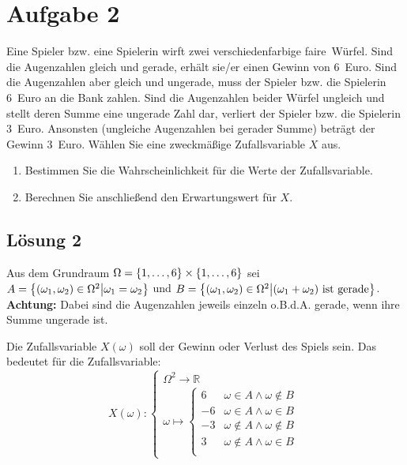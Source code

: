 \documentclass[main.tex]{subfiles}
\begin{document}
\section{Aufgabe 2}
Eine Spieler bzw. eine Spielerin wirft zwei verschiedenfarbige \glqq faire\grqq~Würfel. Sind die Augenzahlen gleich und gerade, erhält sie/er einen Gewinn von 6~Euro. Sind die Augenzahlen aber gleich und ungerade, muss der Spieler bzw. die Spielerin 6~Euro an die Bank zahlen. Sind die Augenzahlen beider Würfel ungleich und stellt deren Summe eine ungerade Zahl dar, verliert der Spieler bzw. die Spielerin 3~Euro. Ansonsten (ungleiche Augenzahlen bei gerader Summe) beträgt der Gewinn 3~Euro. Wählen Sie eine zweckmäßige Zufallsvariable $X$ aus.
\begin{enumerate}
    \item Bestimmen Sie die Wahrscheinlichkeit für die Werte der Zufallsvariable.
    \item Berechnen Sie anschließend den Erwartungswert für $X$.
\end{enumerate}

\subsection{Lösung 2}
Aus dem Grundraum $\Omega = \set*{1,\ldots, 6} \times \set*{1,\ldots, 6}$ sei $A=\set*{(\omega_1, \omega_2)\in \Omega^2 \middle| \omega_1 = \omega_2}$ und $B=\set*{(\omega_1, \omega_2)\in \Omega^2 \middle| (\omega_1 + \omega_2) \text{ ist gerade}}$. \textbf{Achtung:} Dabei sind die Augenzahlen jeweils einzeln o.B.d.A. gerade, wenn ihre Summe ungerade ist.

Die Zufallsvariable $X(\omega)$ soll der Gewinn oder Verlust des Spiels sein. Das bedeutet für die Zufallsvariable:
$$
    X(\omega) : \begin{cases}
        \Omega^2 \to \mathbb{R}\\
        \omega \mapsto \begin{cases}
            6 & \omega \in A \land \omega \notin B \\
            -6 & \omega \in A \land \omega \in B \\
            -3 & \omega \notin A \land \omega \notin B \\
            3 & \omega \notin A \land \omega \in B \\
        \end{cases}
    \end{cases}
$$

\end{document}
